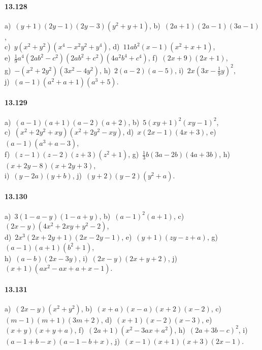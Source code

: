 \paragraph{13.128}
a)~$(y+1)(2y-1)(2y-3)\left(y^{2}+y+1\right)$,\quad 
b)~$(2a+1)(2a-1)(3a-1)$,\protect\\
c)~$y\left(x^{2}+y^{2}\right)\left(x^{4}-x^{2}y^{2}+y^{4}\right)$,\quad 
d)~$11ab^{2}(x-1)\left(x^{2}+x+1\right)$,\protect\\
e)~$\frac{1}{9}a^{4}\left(2ab^{2}-c^{2}\right)\left(2ab^{2}+c^{2}\right)\left(4a^{2}b^{4}+c^{4}\right)$,\quad 
f)~$(2x+9)(2x+1)$,\protect\\
g)~$-\left(x^{2}+2y^{2}\right)\left(3x^{2}-4y^{2}\right)$,\quad 
h)~$2(a-2)(a-5)$,\quad 
i)~$2x\left(3x-\frac{1}{9}y\right)^{2}$,\protect\\
j)~$(a-1)\left(a^{2}+a+1\right)\left(a^{3}+5\right)$.

\paragraph{13.129}
a)~$(a-1)(a+1)(a-2)(a+2)$,\quad 
b)~$5(xy+1)^{2}(xy-1)^{2}$,\protect\\ 
c)~$\left(x^{2}+2y^{2}+xy\right)\left(x^{2}+2y^{2}-xy\right)$,\quad 
d)~$x(2x-1)(4x+3)$,\quad 
e)~$(a-1)\left(a^{3}+a-3\right)$,\protect\\
f)~$(z-1)(z-2)(z+3)\left(z^{2}+1\right)$,\quad 
g)~$\frac{1}{3}b(3a-2b)(4a+3b)$,\quad 
h)~$(x+2y-8)(x+2y+3)$,\protect\\
i)~$(y-2a)(y+b)$,\quad 
j)~$(y+2)(y-2)\left(y^{2}+a\right)$.

\paragraph{13.130}
a)~$3(1-a-y)(1-a+y)$,\quad 
b)~$(a-1)^{2}(a+1)$,\quad 
c)~$(2x-y)\left(4x^{2}+2xy+y^{2}-2\right)$,\protect\\
d)~$2x^{3}(2x+2y+1)(2x-2y-1)$,\quad 
e)~$(y+1)(zy-z+a)$,\quad 
g)~$(a-1)(a+1)\left(b^{2}+1\right)$,\protect\\
h)~$(a-b)(2x-3y)$,\quad
i)~$(2x-y)(2x+y+2)$,\quad 
j)~$(x+1)\left(ax^{2}-ax+a+x-1\right)$.

\paragraph{13.131}
a)~$(2x-y)\left(x^{2}+y^{2}\right)$,\quad 
b)~$(x+a)(x-a)(x+2)(x-2)$,\quad 
c)~$(m-1)(m+1)(3m+2)$,\quad 
d)~$(x+1)(x-2)(x-3)$,\quad 
e)~$(x+y)(x+y+a)$,\quad 
f)~$(2a+1)\left(x^{2}-3ax+a^{2}\right)$,\quad 
h)~$(2a+3b-c)^{2}$,\quad 
i)~$(a-1+b-x)(a-1-b+x)$,\quad 
j)~$(x-1)(x+1)(x+3)(2x-1)$.

